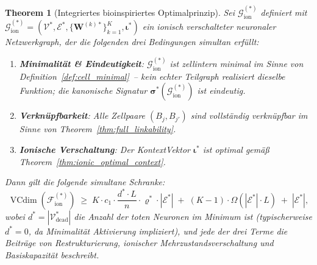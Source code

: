 \documentclass[12pt, a4paper, openany]{report}
\newtheorem{theorem}{Theorem}[chapter]
\newcommand{\calG}{\mathcal{G}}
\newcommand{\calV}{\mathcal{V}}
\newcommand{\calE}{\mathcal{E}}
\newcommand{\calF}{\mathcal{F}}
\DeclareMathOperator{\VC}{VCdim}
\begin{document}
\begin{theorem}[Integriertes bioinspiriertes Optimalprinzip]
\label{thm:bio_master}
Sei  $\calG_{\mathrm{ion}}^{(*)}$ definiert mit $\calG_{\mathrm{ion}}^{(*)} = (\calV^*, \calE^*, \{\bm{W}^{(k)*}\}_{k=1}^K, \bm{\iota}^*)$
ein ionisch verschalteter neuronaler Netzwerkgraph, der die folgenden
drei Bedingungen simultan erfüllt:
\begin{enumerate}[label=(\Roman*)]
  \item \textbf{Minimalität \& Eindeutigkeit}: $\calG_{\mathrm{ion}}^{(*)}$ ist
    zellintern minimal im Sinne von Definition~\ref{def:cell_minimal}~--
    kein echter Teilgraph realisiert dieselbe Funktion; die kanonische
    Signatur $\bm{\sigma}^*(\calG_{\mathrm{ion}}^{(*)})$ ist eindeutig.
  \item \textbf{Verknüpfbarkeit}: Alle Zellpaare $(B_j, B_{j'})$ sind
    vollständig verknüpfbar im Sinne von Theorem~\ref{thm:full_linkability}.
  \item \textbf{Ionische Verschaltung}: Der KontextVektor $\bm{\iota}^*$ ist
    optimal gemäß Theorem~\ref{thm:ionic_optimal_context}.
\end{enumerate}
Dann gilt die folgende simultane Schranke:
\begin{equation}
  \label{eq:bio_master_eq}
  \VC(\calF_{\mathrm{ion}}^{(*)})
  \;\geq\;
  K \cdot c_1 \cdot \frac{d^* \cdot L}{n} \cdot \varrho^* \cdot |\calE^*|
  \;+\;
  (K-1) \cdot \Omega(|\calE^*| \cdot L)
  \;+\;
  |\calE^*|,
\end{equation}
wobei $d^* = |\calV^*_{\mathrm{dead}}|$ die Anzahl der toten Neuronen im
Minimum ist (typischerweise $d^* = 0$, da Minimalität Aktivierung impliziert),
und jede der drei Terme die Beiträge von Restrukturierung, ionischer
Mehrzustandsverschaltung und Basiskapazität beschreibt.
\end{theorem}
\end{document}

